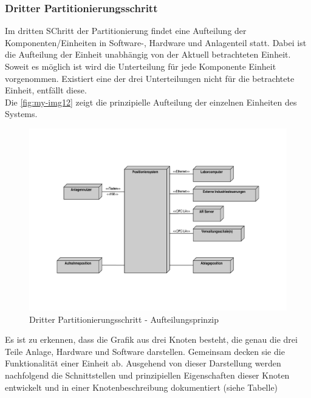 \documentclass[../Bachelorarbeit.tex]{subfiles}
\begin{document}
\subsubsection{Dritter Partitionierungsschritt}
Im dritten SChritt der Partitionierung findet eine Aufteilung der Komponenten/Einheiten in Software-, Hardware und Anlagenteil statt. Dabei ist die Aufteilung der Einheit unabhängig von der Aktuell betrachteten Einheit. Soweit es möglich ist wird die Unterteilung für jede Komponente \bzw Einheit vorgenommen. Existiert eine der drei Unterteilungen nicht für die betrachtete Einheit, entfällt diese.\\
Die \autoref{fig:my-img12} zeigt die prinzipielle Aufteilung der einzelnen Einheiten des Systems.

\begin{figure}[H]
    \centering
    \includegraphics[width=\textwidth]{Images/phys_abgrenzung.pdf}
    \caption[Dritter Partitionierungsschritt]{Dritter Partitionierungsschritt - Aufteilungsprinzip}
    \label{fig:my-img12}
\end{figure}

Es ist zu erkennen, dass die Grafik aus drei Knoten besteht, die genau die drei Teile Anlage, Hardware und Software darstellen. Gemeinsam decken sie die Funktionalität einer Einheit ab. Ausgehend von dieser Darstellung werden nachfolgend die Schnittstellen und prinzipiellen Eigenschaften dieser Knoten entwickelt und in einer Knotenbeschreibung dokumentiert (siehe Tabelle) \\ %
\end{document}
